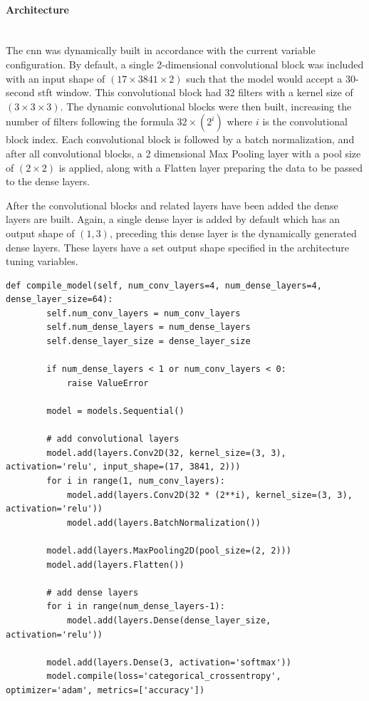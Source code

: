 \documentclass[12pt]{article}
\begin{document}
\paragraph{Architecture}\mbox{}\\


The \acrshort{cnn} was dynamically built in accordance with the current variable configuration. By default, a single 2-dimensional convolutional block was included with an input shape of $(17\times3841\times2)$ such that the model would accept a 30-second \acrshort{stft} window. This convolutional block had 32 filters with a kernel size of $(3\times3\times3)$. The dynamic convolutional blocks were then built, increasing the number of filters following the formula $32 \times (2^i)$ where $i$ is the convolutional block index. Each convolutional block is followed by a batch normalization, and after all convolutional blocks, a 2 dimensional Max Pooling layer with a pool size of $(2\times2)$ is applied, along with a Flatten layer preparing the data to be passed to the dense layers.

After the convolutional blocks and related layers have been added the dense layers are built. Again, a single dense layer is added by default which has an output shape of $(1, 3)$, preceding this dense layer is the dynamically generated dense layers. These layers have a set output shape specified in the architecture tuning variables.


\begin{lstlisting}[style=pythonstyle, caption={Function which dynamically builds an \acrshort{cnn} model from the specified parameters. Logging has been removed.}, label={lst:compile-model}]
    def compile_model(self, num_conv_layers=4, num_dense_layers=4, dense_layer_size=64):
        self.num_conv_layers = num_conv_layers
        self.num_dense_layers = num_dense_layers 
        self.dense_layer_size = dense_layer_size 

        if num_dense_layers < 1 or num_conv_layers < 0: 
            raise ValueError

        model = models.Sequential()

        # add convolutional layers
        model.add(layers.Conv2D(32, kernel_size=(3, 3), activation='relu', input_shape=(17, 3841, 2)))
        for i in range(1, num_conv_layers):
            model.add(layers.Conv2D(32 * (2**i), kernel_size=(3, 3), activation='relu'))
            model.add(layers.BatchNormalization())

        model.add(layers.MaxPooling2D(pool_size=(2, 2)))
        model.add(layers.Flatten())

        # add dense layers
        for i in range(num_dense_layers-1):
            model.add(layers.Dense(dense_layer_size, activation='relu'))

        model.add(layers.Dense(3, activation='softmax'))
        model.compile(loss='categorical_crossentropy', optimizer='adam', metrics=['accuracy'])
\end{lstlisting}
\end{document}
